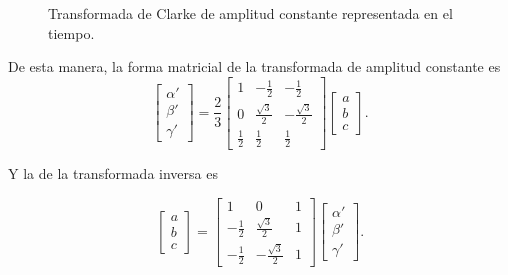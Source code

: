 \begin{figure}[H]
	\centering
	\hspace*{-1.5cm}
	\caption{Transformada de Clarke de amplitud constante representada en el tiempo.}
\end{figure}

De esta manera, la forma matricial de la transformada de amplitud constante es
\begin{equation}
    \begin{bmatrix}
        \alpha' \\
        \beta' \\
        \gamma'
    \end{bmatrix}
    =
    \frac{2}{3}
    \begin{bmatrix}
        1 & -\frac{1}{2} & -\frac{1}{2} \\
        0 & \frac{\sqrt{3}}{2} & -\frac{\sqrt{3}}{2} \\
        \frac{1}{2} & \frac{1}{2} & \frac{1}{2}
    \end{bmatrix}
    \begin{bmatrix}
        a \\
        b \\
        c
    \end{bmatrix} \text{.}
\end{equation}

Y la de la transformada inversa es 

\begin{equation}
    \begin{bmatrix}
        a \\
        b \\
        c
    \end{bmatrix}
    =
    \begin{bmatrix}
        1 & 0 & 1 \\
        -\frac{1}{2} & \frac{\sqrt{3}}{2} & 1 \\
        -\frac{1}{2} & -\frac{\sqrt{3}}{2} & 1
    \end{bmatrix}
    \begin{bmatrix}
        \alpha' \\
        \beta' \\
        \gamma'
    \end{bmatrix} \text{.}
\end{equation}

